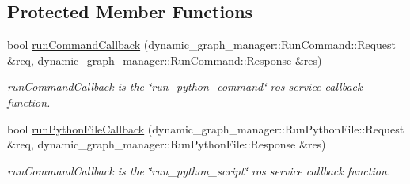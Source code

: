 \subsection*{Protected Member Functions}
\begin{DoxyCompactItemize}
\item 
bool \hyperlink{classdynamic__graph_1_1RosPythonInterpreter_af589eb361f3193c48c7e7f2eb5a3ff64}{run\+Command\+Callback} (dynamic\+\_\+graph\+\_\+manager\+::\+Run\+Command\+::\+Request \&req, dynamic\+\_\+graph\+\_\+manager\+::\+Run\+Command\+::\+Response \&res)
\begin{DoxyCompactList}\small\item\em run\+Command\+Callback is the \char`\"{}run\+\_\+python\+\_\+command\char`\"{} ros service callback function. \end{DoxyCompactList}\item 
bool \hyperlink{classdynamic__graph_1_1RosPythonInterpreter_a519321128872afdcec622a4892c63196}{run\+Python\+File\+Callback} (dynamic\+\_\+graph\+\_\+manager\+::\+Run\+Python\+File\+::\+Request \&req, dynamic\+\_\+graph\+\_\+manager\+::\+Run\+Python\+File\+::\+Response \&res)
\begin{DoxyCompactList}\small\item\em run\+Command\+Callback is the \char`\"{}run\+\_\+python\+\_\+script\char`\"{} ros service callback function. \end{DoxyCompactList}\end{DoxyCompactItemize}
